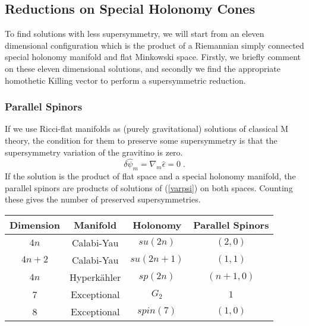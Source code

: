 \documentclass[a4paper,12pt]{article}
\begin{document}
\subsection{Reductions on Special Holonomy Cones}
To find solutions with less supersymmetry, we will start from an eleven dimensional configuration which is the product of a Riemannian simply connected special holonomy manifold and flat Minkowski space. Firstly, we briefly comment on these eleven dimensional solutions, and secondly we find the appropriate homothetic Killing vector to perform a supersymmetric reduction. 
\subsubsection{Parallel Spinors}
If we use Ricci-flat manifolds as (purely gravitational) solutions of classical M theory, the condition for them to preserve some supersymmetry is that the supersymmetry variation of the gravitino is zero.
\begin{equation} \label{varpsi}
\delta \hat{\psi}_m=\nabla_m \hat{\epsilon}=0\; .
\end{equation}
If the solution is the product of flat space and a special holonomy manifold, the parallel spinors are
products of solutions of (\ref{varpsi}) on both spaces. Counting these
gives the number of preserved supersymmetries.
\begin{center}
\begin{tabular}[t]{|c|c|c|c|}
\hline
Dimension  & Manifold & Holonomy & Parallel Spinors\\
\hline 
\hline
$4n$&Calabi-Yau&$su(2n)$&$(2,0)$\\
$4n+2$&Calabi-Yau&$su(2n+1)$&$(1,1)$\\
$4n$&Hyperk\"ahler&$sp(2n)$&$(n+1,0)$\\
7&Exceptional&$G_2$&$1$\\
8&Exceptional&$spin(7)$&$(1,0)$\\
\hline
\end{tabular} 
\end{center} 
\end{document}
